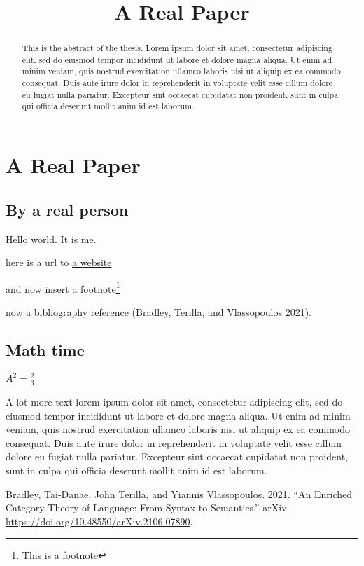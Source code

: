 \documentclass[twoside]{mitthesis}
\title{A Real Paper}
\begin{document}
\maketitle

\begin{abstract}
This is the abstract of the thesis. Lorem ipsum dolor sit amet,
consectetur adipiscing elit, sed do eiusmod tempor incididunt ut labore
et dolore magna aliqua. Ut enim ad minim veniam, quis nostrud
exercitation ullamco laboris nisi ut aliquip ex ea commodo consequat.
Duis aute irure dolor in reprehenderit in voluptate velit esse cillum
dolore eu fugiat nulla pariatur. Excepteur sint occaecat cupidatat non
proident, sunt in culpa qui officia deserunt mollit anim id est laborum.
\end{abstract}

  \tableofcontents
  \listoffigures
  \listoftables

\section{A Real Paper}\label{a-real-paper}

\subsection{By a real person}\label{by-a-real-person}

Hello world. It is me.

here is a url to \href{https://test.com/}{a website}

and now insert a footnote\footnote{This is a footnote}

now a bibliography reference (Bradley, Terilla, and Vlassopoulos 2021).

\subsection{Math time}\label{math-time}

\(A^2 = \frac{2}{3}\)

A lot more text lorem ipsum dolor sit amet, consectetur adipiscing elit,
sed do eiusmod tempor incididunt ut labore et dolore magna aliqua. Ut
enim ad minim veniam, quis nostrud exercitation ullamco laboris nisi ut
aliquip ex ea commodo consequat. Duis aute irure dolor in reprehenderit
in voluptate velit esse cillum dolore eu fugiat nulla pariatur.
Excepteur sint occaecat cupidatat non proident, sunt in culpa qui
officia deserunt mollit anim id est laborum.

\protect{}\label{refs}
\begin{CSLReferences}{1}{0}
Bradley, Tai-Danae, John Terilla, and Yiannis Vlassopoulos. 2021. {``An
Enriched Category Theory of Language: From Syntax to Semantics.''}
arXiv. \url{https://doi.org/10.48550/arXiv.2106.07890}.

\end{CSLReferences}

\printbibliography
\end{document}
